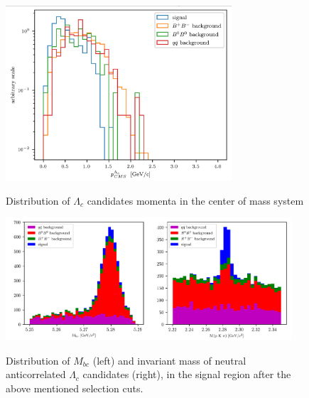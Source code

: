 \begin{figure}[h!]
        {\includegraphics[width=0.75\textwidth]{03-Selection/figs/acorrB0_Lambda_c_CMS_P_optimisedSigProb_R.png}}
        \caption{Distribution of  $\Lambda_c$ candidates momenta in the center of mass system}
        \label{fig:acorrB0_Lambda_c_CMS_P_optimisedSigProb_R}
        \end{figure}

    \begin{figure}[h!]
        {\includegraphics[width=0.95\textwidth]{03-Selection/figs/B0acorr_Mbc_MpKpi_optmised.png}}
        \caption{Distribution of $M_{bc} $ (left) and invariant mass of neutral anticorrelated $\Lambda_c$  candidates (right), in the signal region after the above mentioned selection cuts.}
        \label{fig:B0acorr_Mbc_MpKpi_optmised}
        \end{figure}
                            

        \newpage